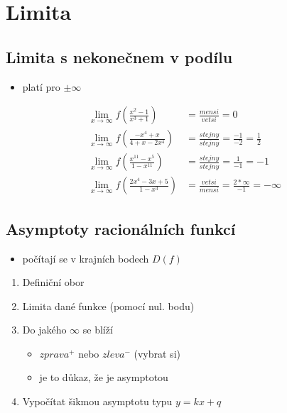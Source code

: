 \section{Limita}
\subsection{Limita s nekonečnem v podílu}
\begin{itemize}
  \item platí pro $\pm\infty$
\end{itemize}
\begin{align*}
  \lim_{x \to \infty}f(\frac{x^2-1}{x^3+1})&=\frac{mensi}{vetsi}=0 \\
  \lim_{x \to \infty}f(\frac{-x^4+x}{4+x-2x^4})&=\frac{stejny}{stejny}=\frac{-1}{-2}=\frac{1}{2} \\
  \lim_{x \to \infty}f(\frac{x^{11}-x^5}{1-x^{11}})&=\frac{stejny}{stejny}=\frac{1}{-1}=-1 \\
  \lim_{x \to \infty}f(\frac{2x^4-3x+5}{1-x^3})&=\frac{vetsi}{mensi}=\frac{2*\infty}{-1}=-\infty
\end{align*}


\subsection{Asymptoty racionálních funkcí}
\begin{itemize}
  \item počítají se v krajních bodech $D(f)$
\end{itemize}
\begin{enumerate}
  \item Definiční obor
  \item Limita dané funkce (pomocí nul. bodu)
  \item Do jakého $\infty$ se blíží
    \begin{itemize}
      \item $zprava^+$ nebo $zleva^-$ (vybrat si)
      \item je to důkaz, že je asymptotou
    \end{itemize}
  \item Vypočítat šikmou asymptotu typu $y=kx+q$
\end{enumerate}

